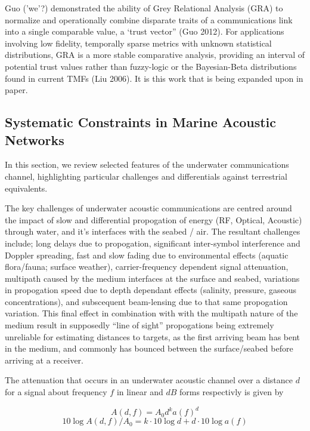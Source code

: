\documentclass[runningheads,a4paper]{llncs}
\begin{document}
Guo ('we'?) demonstrated the ability of Grey Relational Analysis (GRA) to normalize and operationally combine disparate traits of a communications link into a single comparable value, a ‘trust vector” (Guo 2012).
For applications involving low fidelity, temporally sparse metrics with unknown statistical distributions, GRA is a more stable comparative analysis, providing an interval of potential trust values rather than fuzzy-logic or the Bayesian-Beta distributions found in current TMFs (Liu 2006). 
It is this work that is being expanded upon in paper.

\subsection{Systematic Constraints in Marine Acoustic Networks}

In this section, we review selected features of the underwater communications channel, highlighting particular challenges and differentials against terrestrial equivalents. 

The key challenges of underwater acoustic communications are centred around the impact of slow and differential propogation of energy (RF, Optical, Acoustic) through water, and it's interfaces with the seabed / air.
The resultant challenges include; long delays due to propogation, significant inter-symbol interference and Doppler spreading, fast and slow fading due to environmental effects (aquatic flora/fauna; surface weather), carrier-frequency dependent signal attenuation, multipath caused by the medium interfaces at the surface and seabed, variations in propogation speed due to depth dependant effects (salinity, pressure, gaseous concentrations), and subscequent beam-lensing due to that same propogation variation. 
This final effect in combination with with the multipath nature of the medium result in supposedly ``line of sight'' propogations being extremely unreliable for estimating distances to targets, as the first arriving beam has bent in the medium, and commonly has bounced between the surface/seabed before arriving at a receiver. 

The attenuation that occurs in an underwater acoustic channel over a distance $d$ for a signal about frequency $f$ in linear and $dB$ forms respectivly is given by

\begin{equation}
  \label{eq:acoattenuation}
  A(d,f) = A_0d^ka(f)^d
\end{equation}
\begin{equation}
  \label{eq:acoattenuationdb}
  10 \log A(d,f)/A_0 = k \cdot 10 \log d + d \cdot 10 \log a(f)
\end{equation}
\end{document}
